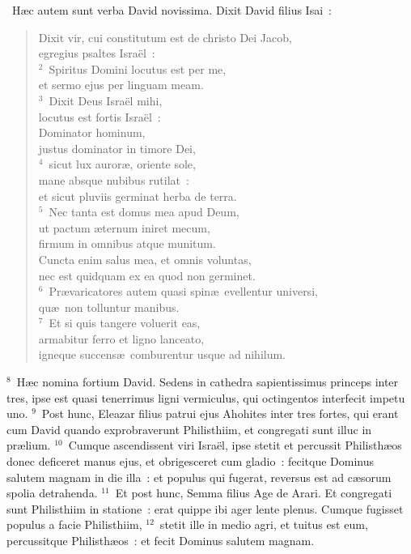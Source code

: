 ~H\ae c autem sunt verba David novissima. Dixit David filius Isai~: \begin{flushleft}\begin{verse}\vspace{6pt}Dixit vir, cui constitutum est de christo Dei Jacob,\\ egregius psaltes Isra\"el~:\\
${}^{2}$~Spiritus Domini locutus est per me,\\ et sermo ejus per linguam meam.\\
${}^{3}$~Dixit Deus Isra\"el mihi,\\ locutus est fortis Isra\"el~:\\ Dominator hominum,\\ justus dominator in timore Dei,\\
${}^{4}$~sicut lux auror\ae , oriente sole,\\ mane absque nubibus rutilat~:\\ et sicut pluviis germinat herba de terra.\\
${}^{5}$~Nec tanta est domus mea apud Deum,\\ ut pactum \ae ternum iniret mecum,\\ firmum in omnibus atque munitum.\\ Cuncta enim salus mea, et omnis voluntas,\\ nec est quidquam ex ea quod non germinet.\\
${}^{6}$~Pr\ae varicatores autem quasi spin\ae\ evellentur universi,\\ qu\ae\ non tolluntur manibus.\\
${}^{7}$~Et si quis tangere voluerit eas,\\ armabitur ferro et ligno lanceato,\\ igneque succens\ae\ comburentur usque ad nihilum.\end{verse}\end{flushleft}


${}^{8}$~H\ae c nomina fortium David. Sedens in cathedra sapientissimus princeps inter tres, ipse est quasi tenerrimus ligni vermiculus, qui octingentos interfecit impetu uno.
${}^{9}$~Post hunc, Eleazar filius patrui ejus Ahohites inter tres fortes, qui erant cum David quando exprobraverunt Philisthiim, et congregati sunt illuc in pr\ae lium.
${}^{10}$~Cumque ascendissent viri Isra\"el, ipse stetit et percussit Philisth\ae os donec deficeret manus ejus, et obrigesceret cum gladio~: fecitque Dominus salutem magnam in die illa~: et populus qui fugerat, reversus est ad c\ae sorum spolia detrahenda.
${}^{11}$~Et post hunc, Semma filius Age de Arari. Et congregati sunt Philisthiim in statione~: erat quippe ibi ager lente plenus. Cumque fugisset populus a facie Philisthiim,
${}^{12}$~stetit ille in medio agri, et tuitus est eum, percussitque Philisth\ae os~: et fecit Dominus salutem magnam.


